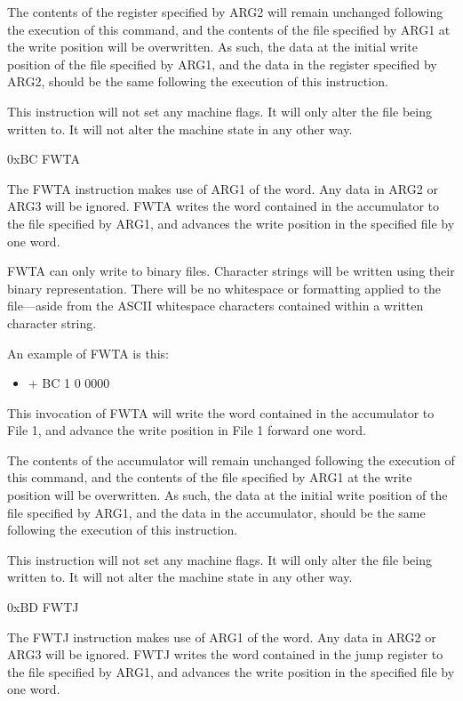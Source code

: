 \documentclass[]{article}
\providecommand{\tightlist}{%
  \setlength{\itemsep}{0pt}\setlength{\parskip}{0pt}}
\begin{document}
The contents of the register specified by ARG2 will remain unchanged
following the execution of this command, and the contents of the file
specified by ARG1 at the write position will be overwritten. As such,
the data at the initial write position of the file specified by ARG1,
and the data in the register specified by ARG2, should be the same
following the execution of this instruction.

This instruction will not set any machine flags. It will only alter the
file being written to. It will not alter the machine state in any other
way.

0xBC FWTA

The FWTA instruction makes use of ARG1 of the word. Any data in ARG2 or
ARG3 will be ignored. FWTA writes the word contained in the accumulator
to the file specified by ARG1, and advances the write position in the
specified file by one word.

FWTA can only write to binary files. Character strings will be written
using their binary representation. There will be no whitespace or
formatting applied to the file---aside from the ASCII whitespace
characters contained within a written character string.

An example of FWTA is this:

\begin{itemize}
\tightlist
\item
  + BC 1 0 0000
\end{itemize}

This invocation of FWTA will write the word contained in the accumulator
to File 1, and advance the write position in File 1 forward one word.

The contents of the accumulator will remain unchanged following the
execution of this command, and the contents of the file specified by
ARG1 at the write position will be overwritten. As such, the data at the
initial write position of the file specified by ARG1, and the data in
the accumulator, should be the same following the execution of this
instruction.

This instruction will not set any machine flags. It will only alter the
file being written to. It will not alter the machine state in any other
way.

0xBD FWTJ

The FWTJ instruction makes use of ARG1 of the word. Any data in ARG2 or
ARG3 will be ignored. FWTJ writes the word contained in the jump
register to the file specified by ARG1, and advances the write position
in the specified file by one word.
\end{document}
